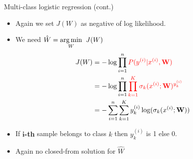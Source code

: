 \documentclass[serif, aspectratio=169]{beamer}
\begin{document}
    \begin{frame}{Multi-class logistic regression (cont.)}
        \begin{itemize}
            \item Again we set $J(W)$ as negative of log likelihood.
            \item We need $\hat{W} = \underset{W}{\arg\min} \hspace{0.2cm} J(W)$
            \begin{align*}
                J(W) &= -\log \prod_{i=1}^{n} \textcolor{red}{P(y^{(i)}|x^{(i)}, \mathbf{W})} \\
                &= -\log \prod_{i=1}^{n}\textcolor{red}{\prod_{k=1}^{K}\sigma _k(x^{(i)}; \mathbf{W})^{y_k^{(i)}} }\\
                &= -\sum_{i=1}^{n}\sum_{k=1}^{K}y_k^{(i)} \log (\sigma _k(x^{(i)}; \mathbf{W}))
            \end{align*}
            \item If \textbf{$\textbf{i}$-th} sample belongs to class $k$ then $y^{(i)}_k$ is 1 else 0.
            \item Again no closed-from solution for $\hat{W}$
        \end{itemize}

    \end{frame}
\end{document}
